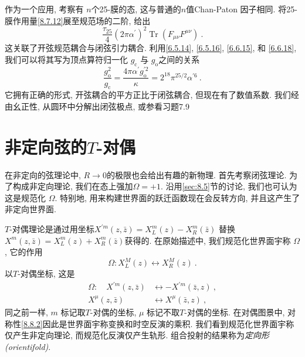 作为一个应用, 考察有 $n$个25-膜的态, 这与普通的$n$值Chan-Paton 因子相同. 将25-膜作用量\eqref{8.7.12}展至规范场的二阶, 给出
\begin{equation}
	\frac{\tau_{25}}{4}(2 \pi \alpha^{\prime})^{2} \operatorname{Tr}(F_{\mu \nu} F^{\mu \nu}) \:. \label{8.7.27}
\end{equation}
这关联了开弦规范耦合与闭弦引力耦合. 利用\eqref{6.5.14}, \eqref{6.5.16}, \eqref{6.6.15}, 和 \eqref{6.6.18}, 
我们可以将其写为顶点算符归一化 $g_{\mathrm{c}}$ 与 $g_{\mathrm{o}}$之间的关系
\begin{equation}
	\frac{g_{\mathrm{o}}^{2}}{g_{\mathrm{c}}} = \frac{4 \pi \alpha^{\prime} g_{\mathrm{o}}^{\prime 2}}{\kappa}
											  = 2^{18} \pi^{25 / 2} \alpha^{\prime 6} \:. \label{8.7.28}
\end{equation}
它拥有正确的形式, 开弦耦合的平方正比于闭弦耦合, 但现在有了数值系数. 我们经由幺正性, 从圆环中分解出闭弦极点, 或参看习题7.9


\section{非定向弦的$T$-对偶} \label{sec:8.8}%
在非定向的弦理论中,  $R \rightarrow 0$的极限也会给出有趣的新物理. 首先考察闭弦理论. 为了构成非定向理论, 我们在态上强加$\Omega=+1$. 
沿用\ref{sec:8.5}节的讨论, 我们也可认为这是规范化 $\Omega$. 特别地, 用来构建世界面的跃迁函数现在会反转方向, 并且这产生了非定向世界面.

$T$-对偶理论是通过用坐标$X^{\prime m}(z, \bar{z})= X_{L}^{m}(z)-X_{R}^{m}(\bar{z})$ 替换 
$X^{m}(z, \bar{z})=X_{L}^{m}(z)+X_{R}^{m}(\bar{z})$获得的. 在原始描述中, 我们规范化世界面宇称 $\Omega$, 它的作用
\begin{equation}
	\Omega: X_{L}^{M}(z) \leftrightarrow X_{R}^{M}(z) \:. \label{8.8.1}
\end{equation}
以$T$-对偶坐标, 这是
\begin{subequations} \label{8.8.2}
	\begin{align}
		\Omega: \quad X^{\prime m}(z, \bar{z})  &\leftrightarrow-X^{\prime m}(\bar{z}, z) \:, \label{8.8.2a} \\
		X^{\mu}(z, \bar{z})  &\leftrightarrow X^{\mu}(\bar{z}, z) \:, \label{8.8.2b}
	\end{align}
\end{subequations}
同之前一样,  $m$ 标记取$T$-对偶的坐标, $\mu$ 标记不取$T$-对偶的坐标. 在对偶图景中, 对称性\eqref{8.8.2}因此是世界面宇称变换和时空反演的乘积. 
我们看到规范化世界面宇称仅产生非定向理论, 而规范化反演仅产生轨形. 组合投射的结果称为\emph{定向形(orientifold)}.

